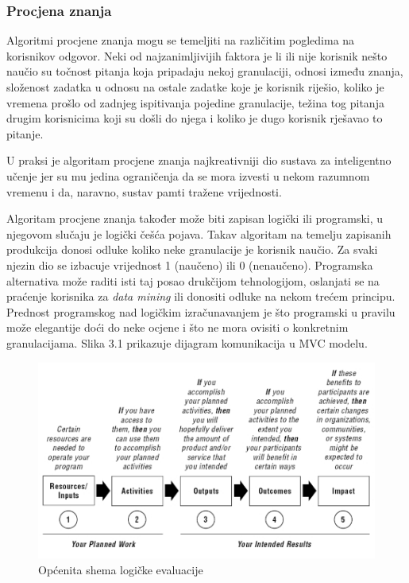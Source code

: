 \documentclass[times, utf8, zavrsni, numeric]{fer}
\begin{document}
\subsubsection{Procjena znanja}
Algoritmi procjene znanja mogu se temeljiti na različitim pogledima na korisnikov odgovor. Neki od najzanimljivijih faktora je li ili nije korisnik nešto naučio su točnost pitanja koja pripadaju nekoj granulaciji, odnosi između znanja, složenost zadatka u odnosu na ostale zadatke koje je korisnik riješio, koliko je vremena prošlo od zadnjeg ispitivanja pojedine granulacije, težina tog pitanja drugim korisnicima koji su došli do njega i koliko je dugo korisnik rješavao to pitanje.
\par
U praksi je algoritam procjene znanja najkreativniji dio sustava za inteligentno učenje jer su mu jedina ograničenja da se mora izvesti u nekom razumnom vremenu i da, naravno, sustav pamti tražene vrijednosti.
\par
Algoritam procjene znanja također može biti zapisan logički ili programski, u njegovom slučaju je logički češća pojava. Takav algoritam na temelju zapisanih produkcija donosi odluke koliko neke granulacije je korisnik naučio. Za svaki njezin dio se izbacuje vrijednost 1 (naučeno) ili 0 (nenaučeno). Programska alternativa može raditi isti taj posao drukčijom tehnologijom, oslanjati se na praćenje korisnika za \textit{data mining} ili donositi odluke na nekom trećem principu. Prednost programskog nad logičkim izračunavanjem je što programski u pravilu može elegantije doći do neke ocjene i što ne mora ovisiti o konkretnim granulacijama. Slika 3.1 prikazuje dijagram komunikacija u MVC modelu.

\begin{figure}[htb]
	\centering
	\includegraphics[]{img/logic.jpg}
	\caption{Općenita shema logičke evaluacije\cite{logicalevalpic}}
	\label{fig:logic_eval}
\end{figure}
\end{document}
